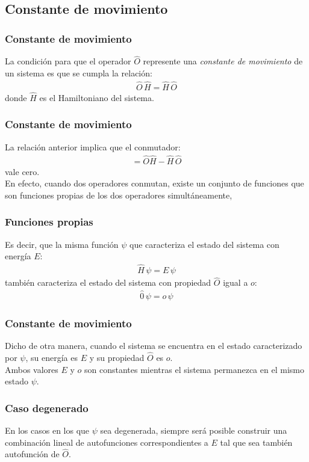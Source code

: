 \subsection{Constante de movimiento}
\begin{frame}
\frametitle{Constante de movimiento}
La condición para que el operador $\hat{O}$ represente una \emph{constante de movimiento} de un sistema es que se cumpla la relación:
\begin{align}
\hat{O} \, \hat{H} = \hat{H} \, \hat{O}
\label{eq:ecuacion_01_05}
\end{align}
\pause
donde $\hat{H}$ es el Hamiltoniano del sistema.
\end{frame}
\begin{frame}
\frametitle{Constante de movimiento}
La relación anterior implica que el conmutador:
\begin{align}
[\hat{O}, \hat{H}] = \hat{O} \hat{H} - \hat{H} \, \hat{O}
\label{eq:ecuacion_01_06}
\end{align}
vale cero.
\\
\bigskip
\pause
En efecto, cuando dos operadores conmutan, existe un conjunto de funciones que son funciones propias de los dos operadores simultáneamente,
\end{frame}
\begin{frame}
\frametitle{Funciones propias}
Es decir, que la misma función $\psi$ que caracteriza el estado del sistema con energía $E$:
\begin{align*}
\hat{H} \, \psi = E \, \psi
\end{align*}
\pause
también caracteriza el estado del sistema con propiedad $\hat{O}$ igual a $o$:
\begin{align*}
\hat{0} \, \psi = o \, \psi
\end{align*}
\end{frame}
\begin{frame}
\frametitle{Constante de movimiento}
Dicho de otra manera, cuando el sistema se encuentra en el estado caracterizado por $\psi$, su energía es $E$ y su propiedad $\hat{O}$ es $o$.
\\
\bigskip
\pause
Ambos valores $E$ y $o$ son constantes mientras el sistema permanezca en el mismo estado $\psi$.
\end{frame}
\begin{frame}
\frametitle{Caso degenerado}
En los casos en los que $\psi$ sea degenerada, siempre será posible construir una combinación lineal de autofunciones correspondientes a $E$ tal que sea también autofunción de $\hat{O}$.
\end{frame}
